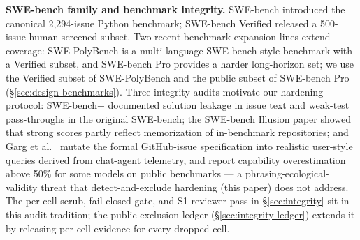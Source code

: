 \textbf{SWE-bench family and benchmark integrity.} SWE-bench \citep{swebench2024}
introduced the canonical 2{,}294-issue Python benchmark; SWE-bench Verified
\citep{swebenchverified2024} released a 500-issue human-screened subset. Two recent
benchmark-expansion lines extend coverage: SWE-PolyBench \citep{swepolybench2025} is a
multi-language SWE-bench-style benchmark with a Verified subset, and SWE-bench Pro
\citep{swebenchpro2025} provides a harder long-horizon set; we use the Verified subset of
SWE-PolyBench and the public subset of SWE-bench Pro
(\S\ref{sec:design-benchmarks}). Three integrity audits motivate our hardening protocol:
SWE-bench+ \citep{swebenchplus2024} documented solution leakage in issue text and
weak-test pass-throughs in the original SWE-bench; the SWE-bench Illusion paper
\citep{swebenchillusion2025} showed that strong scores partly reflect memorization of
in-benchmark repositories; and Garg et al.\ \citep{savingswebench2025} mutate the formal
GitHub-issue specification into realistic user-style queries derived from chat-agent
telemetry, and report capability overestimation above 50\% for some models on
public benchmarks --- a phrasing-ecological-validity threat that detect-and-exclude
hardening (this paper) does not address. The per-cell scrub, fail-closed gate, and S1
reviewer pass in \S\ref{sec:integrity} sit in this audit tradition; the public exclusion
ledger (\S\ref{sec:integrity-ledger}) extends it by releasing per-cell evidence for every
dropped cell.
